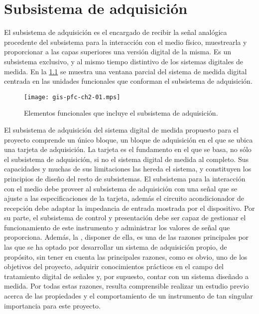 \chapter{Subsistema de adquisición}

El subsistema de adquisición es el encargado de recibir la señal analógica
procedente del subsistema para la interacción con el medio físico,
muestrearla y proporcionar a las capas superiores una versión digital de la
misma. Es un subsistema exclusivo, y al mismo tiempo distintivo de los
sistemas digitales de medida. En la \cref{fig:subacqui} se muestra una
ventana parcial del sistema de medida digital centrada en las unidades
funcionales que conforman el subsistema de adquisición.

\begin{figure}
	\begin{center}
		\texttt{[image: gis-pfc-ch2-01.mps]}
	\end{center}
	\caption[Subsistema de adquisición] {Elementos funcionales que
	incluye el subsistema de adquisición.}
	\label{fig:subacqui}
\end{figure}

El subsistema de adquisición del sistema digital de medida propuesto para
el proyecto comprende un único bloque, un bloque de adquisición en el que
se ubica una tarjeta de adquisición. La tarjeta \kpci{} es el fundamento en
el que se basa, no sólo el subsistema de adquisición, si no el sistema
digital de medida al completo. Sus capacidades y muchas de sus limitaciones
las hereda el sistema, y constituyen los principios de diseño del resto de
subsistemas. El subsistema para la interacción con el medio debe proveer al
subsistema de adquisición con una señal que se ajuste a las
especificaciones de la tarjeta, además el circuito acondicionador de
recepción debe adaptar la impedancia de entrada mostrada por el
dispositivo. Por su parte, el subsistema de control y presentación debe ser
capaz de gestionar el funcionamiento de este instrumento y administrar los
valores de señal que proporciona. Además, la \kpci{}, disponer de ella, es
una de las razones principales por las que se ha optado por desarrollar un
sistema de adquisición propio, de propósito, sin tener en cuenta las
principales razones, como es obvio, uno de los objetivos del proyecto,
adquirir conocimientos prácticos en el campo del tratamiento digital de
señales y, por supuesto, contar con un sistema diseñado a medida. Por todas
estas razones, resulta comprensible realizar un estudio previo acerca de
las propiedades y el comportamiento de un instrumento de tan singular
importancia para este proyecto.

